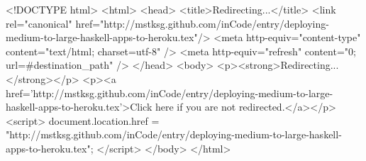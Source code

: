 <!DOCTYPE html>
<html>
<head>
<title>Redirecting...</title>
<link rel="canonical" href="http://mstksg.github.com/inCode/entry/deploying-medium-to-large-haskell-apps-to-heroku.tex"/>
<meta http-equiv="content-type" content="text/html; charset=utf-8" />
<meta http-equiv="refresh" content="0; url=#{destination_path}" />
</head>
<body>
  <p><strong>Redirecting...</strong></p>
  <p><a href='http://mstksg.github.com/inCode/entry/deploying-medium-to-large-haskell-apps-to-heroku.tex'>Click here if you are not redirected.</a></p>
  <script>
    document.location.href = "http://mstksg.github.com/inCode/entry/deploying-medium-to-large-haskell-apps-to-heroku.tex";
  </script>
</body>
</html>
